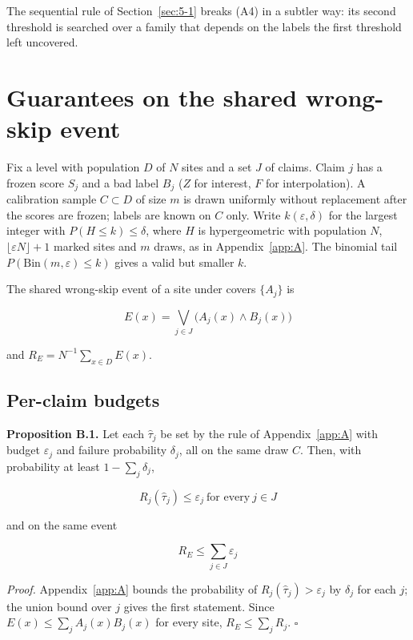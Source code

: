 \documentclass{iopjournal}
\begin{document}
The sequential rule of Section~\ref{sec:5-1} breaks (A4) in a subtler way: its second threshold is searched over a family that depends on the labels the first threshold left uncovered.

\hypertarget{app:B}{%
\section{Guarantees on the shared wrong-skip event}\label{app:B}}

Fix a level with population \(D\) of \(N\) sites and a set \(J\) of claims. Claim \(j\) has a frozen score \(S_j\) and a bad label \(B_j\) (\(Z\) for interest, \(F\) for interpolation). A calibration sample \(C \subset D\) of size \(m\) is drawn uniformly without replacement after the scores are frozen; labels are known on \(C\) only. Write \(k(\varepsilon, \delta)\) for the largest integer with \(P(H \le k) \le \delta\), where \(H\) is hypergeometric with population \(N\), \(\lfloor \varepsilon N \rfloor + 1\) marked sites and \(m\) draws, as in Appendix~\ref{app:A}. The binomial tail \(P(\mathrm{Bin}(m, \varepsilon) \le k)\) gives a valid but smaller \(k\).

The shared wrong-skip event of a site under covers \(\{A_j\}\) is

\[
E(x) = \bigvee_{j \in J} \big(A_j(x) \wedge B_j(x)\big)
\]

and \(R_E = N^{-1} \sum_{x \in D} E(x)\).

\hypertarget{per-claim-budgets}{%
\subsection{Per-claim budgets}\label{per-claim-budgets}}

\textbf{Proposition B.1.} Let each \(\hat\tau_j\) be set by the rule of Appendix~\ref{app:A} with budget \(\varepsilon_j\) and failure probability \(\delta_j\), all on the same draw \(C\). Then, with probability at least \(1 - \sum_j \delta_j\),

\[
R_j(\hat\tau_j) \le \varepsilon_j \ \text{for every} \ j \in J
\]

and on the same event

\[
R_E \le \sum_{j \in J} \varepsilon_j
\]

\emph{Proof.} Appendix~\ref{app:A} bounds the probability of \(R_j(\hat\tau_j) > \varepsilon_j\) by \(\delta_j\) for each \(j\); the union bound over \(j\) gives the first statement. Since \(E(x) \le \sum_j A_j(x) B_j(x)\) for every site, \(R_E \le \sum_j R_j\). \(\square\)
\end{document}
